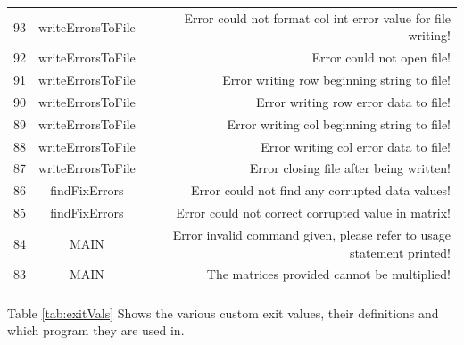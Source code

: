\documentclass{article}
\begin{document}
\begin{table}[H]
\begin{tabulary}{\linewidth}{LCR}
            93 & writeErrorsToFile & Error could not format col int error value for file writing! \\
            92 & writeErrorsToFile & Error could not open file! \\
            91 & writeErrorsToFile & Error writing row beginning string to file! \\
            90 & writeErrorsToFile & Error writing row error data to file! \\
            89 & writeErrorsToFile & Error writing col beginning string to file! \\
            88 & writeErrorsToFile & Error writing col error data to file! \\
            87 & writeErrorsToFile & Error closing file after being written! \\
            86 & findFixErrors & Error could not find any corrupted data values! \\
            85 & findFixErrors & Error could not correct corrupted value in matrix! \\
            84 & MAIN & Error invalid command given, please refer to usage statement printed! \\
            83 & MAIN & The matrices provided cannot be multiplied! \\
            \\
            \hline
        \end{tabulary}
    \end{table}

    Table \ref{tab:exitVals} Shows the various custom exit values, their definitions and which program they are used in.
    
\end{document}
